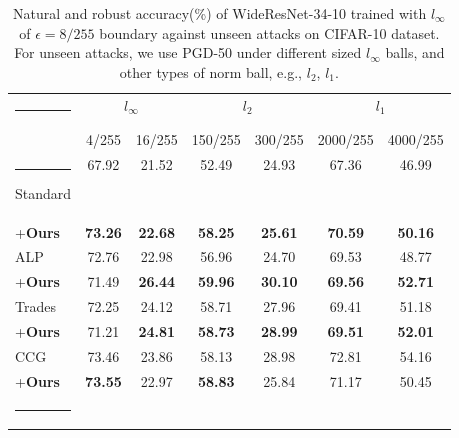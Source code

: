 \documentclass[10pt,twocolumn,letterpaper]{article}
\makeatletter
\def\hlinew#1{%
  \noalign{\ifnum0=`}\fi\hrule \@height #1 \futurelet
   \reserved@a\@xhline}
\makeatother
\begin{document}
     \begin{table*}[!h]
        \centering
        \caption{Natural and robust accuracy(\%) of WideResNet-34-10 trained with $l_{\infty}$ of $\epsilon=8/255$ boundary against unseen attacks on CIFAR-10 dataset. For unseen attacks, we use PGD-50 under different sized $l_\infty$ balls, and other types of norm ball, e.g., $l_{2}$, $l_1$.}
        \label{tab:unseen}
        \begin{tabular}{lcccccc}
        \hlinew{1pt}

         \multirow{2}{*}{{Method}} 
        & \multicolumn{2}{c}{$l_{\infty}$} & \multicolumn{2}{c}{$l_2$} & \multicolumn{2}{c}{$l_1$} \\ \cline{2-7} 
       & 4/255          & 16/255          & 150/255     & 300/255     & 2000/255       & 4000/255      \\ \hlinew{1pt}

          Standard  & 67.92          & 21.52           & 52.49       & 24.93       & 67.36          & 46.99 \\
           \rowcolor{mygray}
          +\textbf{Ours}  & \textbf{73.26}          &\textbf{ 22.68}           & \textbf{58.25 }      & \textbf{25.61 }      & \textbf{70.59 }         & \textbf{50.16} \\
       
         ALP~\cite{Wang2020Improving}    & 72.76          & 22.98           & 56.96       & 24.70       & 69.53          & 48.77  \\  \rowcolor{mygray}
        +\textbf{Ours}     & 71.49 & \textbf{26.44} & \textbf{59.96} & \textbf{30.10}  & \textbf{69.56}    & \textbf{52.71}    \\
         Trades~\cite{Zhang2019tradeoff}  & 72.25          & 24.12           & 58.71       & 27.96       & 69.41          & 51.18 \\ 
          \rowcolor{mygray}
         +\textbf{Ours}     & 71.21 & \textbf{24.81} & \textbf{58.73} & \textbf{28.99 } & \textbf{69.51}    & \textbf{52.01}\\
           CCG\cite{tack2021consistency}   & 73.46          & 23.86           & 58.13       & 28.98       & 72.81          & 54.16 \\ 
            \rowcolor{mygray}
        +\textbf{Ours}  & \textbf{73.55} & 22.97 & \textbf{58.83} & 25.84  & 71.17    & 50.45 \\
        \hlinew{1pt} 
        \end{tabular}
    \end{table*}
\end{document}
